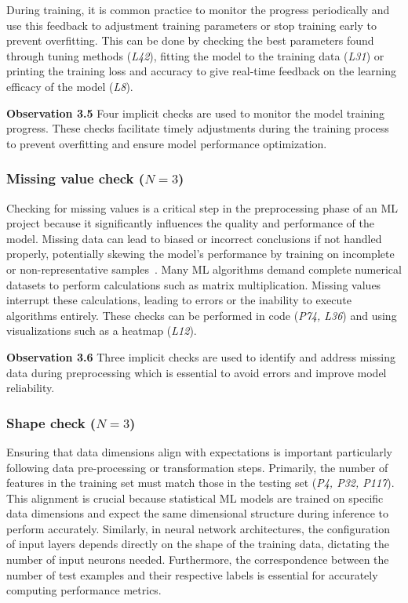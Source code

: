\documentclass[smallextended]{svjour3}       %
\newcommand{\highlight}[1]{\begin{framed}%
  \noindent#1
\end{framed}}
\begin{document}
During training, it is common practice to monitor the progress periodically and use this feedback to adjustment training parameters or stop training early to prevent overfitting. This can be done by checking the best parameters found through tuning methods (\emph{L42}), fitting the model to the training data (\emph{L31}) or printing the training loss and accuracy to give real-time feedback on the learning efficacy of the model (\emph{L8}).

\highlight{\textbf{Observation 3.5} Four implicit checks are used to monitor the model training progress. These checks facilitate timely adjustments during the training process to prevent overfitting and ensure model performance optimization.}

\subsubsection{Missing value check ($N = 3$)}

Checking for missing values is a critical step in the preprocessing phase of an ML project because it significantly influences the quality and performance of the model. Missing data can lead to biased or incorrect conclusions if not handled properly, potentially skewing the model's performance by training on incomplete or non-representative samples~\citep{shome2022data}. Many ML algorithms demand complete numerical datasets to perform calculations such as matrix multiplication. Missing values interrupt these calculations, leading to errors or the inability to execute algorithms entirely. These checks can be performed in code (\emph{P74, L36}) and using visualizations such as a heatmap (\emph{L12}).

\highlight{\textbf{Observation 3.6} Three implicit checks are used to identify and address missing data during preprocessing which is essential to avoid errors and improve model reliability.}

\subsubsection{Shape check ($N = 3$)}

Ensuring that data dimensions align with expectations is important particularly following data pre-processing or transformation steps. Primarily, the number of features in the training set must match those in the testing set (\emph{P4, P32, P117}). This alignment is crucial because statistical ML models are trained on specific data dimensions and expect the same dimensional structure during inference to perform accurately. Similarly, in neural network architectures, the configuration of input layers depends directly on the shape of the training data, dictating the number of input neurons needed. Furthermore, the correspondence between the number of test examples and their respective labels is essential for accurately computing performance metrics.
\end{document}
